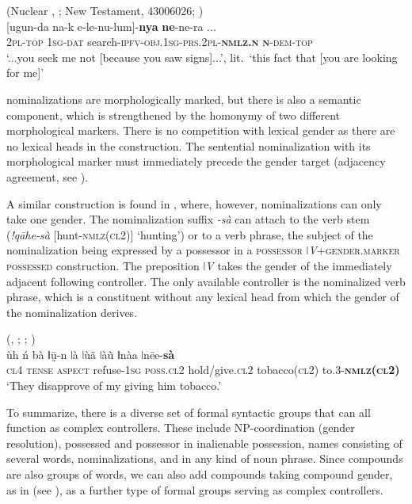 \documentclass[output=collectionpaper]{langsci/langscibook}
\begin{document}
\ea\label{ex:WDG:58}
 (Nuclear , ; New Testament, 43006026; \citealt[80]{Waelchli2018})\\
 [ugun-da	na-k	e-le-nu-lum]-\textbf{nya}	\textbf{ne}-ne-ra {...}\\
{} \textsc{2pl-top}	\textsc{1sg-dat}	search-\textsc{ipfv-obj.1sg-prs.2pl-\textbf{nmlz.n}}	\textsc{\textbf{n}-dem-top} {}\\
\glt `...you seek me not [because you saw signs]...', lit.\ `this fact that [you are looking for me]' \\
\z

 nominalizations are morphologically marked, but there is also a semantic component, which is strengthened by the homonymy of two different morphological markers. There is no competition with lexical gender as there are no lexical heads in the construction. The sentential nominalization with its morphological marker must immediately precede the gender target (adjacency agreement, see ).

A similar construction is found in , where, however, nominalizations can only take one gender. The nominalization suffix \textit{-sà} can attach to the verb stem (\textit{!qāhe-sà} [hunt-\textsc{nmlz(cl2)}] `hunting') or to a verb phrase, the subject of the nominalization being expressed by a possessor in a \textsc{possessor }\textit{ǀV}+\textsc{gender.marker possessed} construction. The preposition \textit{ǀV} takes the gender of the immediately adjacent following controller. The only available controller is the nominalized verb phrase, which is a constituent without any lexical head from which the gender of the nominalization derives.

\ea\label{ex:WDG:59}
 (, ; \citealt[30]{Traill1994}; \citealt[7]{Gueldemann2004})\\
\gll ùh	ń	bà	ǁṵ̄-n	ǀà	ǀùã	{ǀàũ ǁnàa}	ǀnēe-\textbf{sà}\\
\textsc{cl4}	\textsc{tense}	\textsc{aspect}	refuse-\textsc{1sg}	\textsc{poss.cl2}	hold/give.\textsc{cl2}	tobacco(\textsc{cl2})	to.3-\textbf{\textsc{nmlz(cl2)}}\\
\glt `They disapprove of my giving him tobacco.'\\
\z

To summarize, there is a diverse set of formal syntactic groups that can all function as complex controllers. These include NP-coordination (gender resolution), possessed and possessor in inalienable possession, names consisting of several words, nominalizations, and \textendash{} in  \textendash{} any kind of noun phrase. Since compounds are also groups of words, we can also add compounds taking compound gender, as in  (see ), as a further type of formal groups serving as complex controllers.
\end{document}
